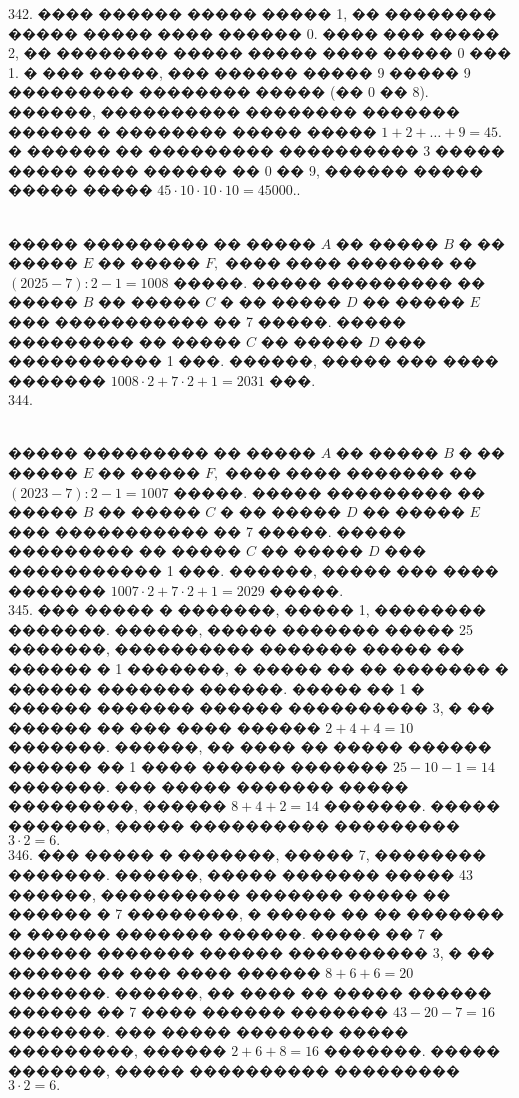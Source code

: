 \documentclass[12pt]{article}
\begin{document}
342. ���� ������ ����� ����� 1, �� �������� ����� ����� ���� ������ 0. ���� ��� ����� 2, �� �������� ����� ����� ���� ����� 0 ��� 1. � ��� �����, ��� ������ ����� 9 ����� 9 ��������� �������� ����� (�� 0 �� 8). ������, ���������� �������� ������� ������ � �������� ����� ����� $1+2+\ldots+9=45.$ � ������ �� ��������� ���������� 3 ����� ����� ���� ������ �� 0 �� 9, ������ ����� ����� ����� $45\cdot10\cdot10\cdot10=45000.$\newpage{}. \begin{figure}[ht!]
\end{figure}\\
����� ��������� �� ����� $A$ �� ����� $B$ � �� ����� $E$ �� ����� $F,$ ���� ���� ������� �� $(2025-7):2-1=1008$ �����. ����� ��������� �� ����� $B$ �� ����� $C$ � �� ����� $D$ �� ����� $E$ ��� ����������� �� 7 �����. ����� ��������� �� ����� $C$ �� ����� $D$ ��� ����������� 1 ���. ������, ����� ��� ���� ������� $1008\cdot2+7\cdot2+1=2031$ ���.\\
344. \begin{figure}[ht!]
\end{figure}\\
����� ��������� �� ����� $A$ �� ����� $B$ � �� ����� $E$ �� ����� $F,$ ���� ���� ������� �� $(2023-7):2-1=1007$ �����. ����� ��������� �� ����� $B$ �� ����� $C$ � �� ����� $D$ �� ����� $E$ ��� ����������� �� 7 �����. ����� ��������� �� ����� $C$ �� ����� $D$ ��� ����������� 1 ���. ������, ����� ��� ���� ������� $1007\cdot2+7\cdot2+1=2029$ �����.\\
345. ��� ����� � �������, ����� 1, �������� �������. ������, ����� ������� ����� 25 �������, ���������� ������� ����� �� ������ � 1 �������, � ����� �� �� ������� � ������ ������� ������. ����� �� 1 � ������ ������� ������ ���������� 3, � �� ������ �� ��� ���� ������ $2+4+4=10$ �������. ������, �� ���� �� ����� ������ ������ �� 1 ���� ������ ������� $25-10-1=14$ �������. ��� ����� ������� ����� ���������, ������ $8+4+2=14$ �������. ����� �������, ����� ���������� ��������� $3\cdot2=6.$\\
346. ��� ����� � �������, ����� 7, �������� �������. ������, ����� ������� ����� 43 ������, ���������� ������� ����� �� ������ � 7 ��������, � ����� �� �� ������� � ������ ������� ������. ����� �� 7 � ������ ������� ������ ���������� 3, � �� ������ �� ��� ���� ������ $8+6+6=20$ �������. ������, �� ���� �� ����� ������ ������ �� 7 ���� ������ ������� $43-20-7=16$ �������. ��� ����� ������� ����� ���������, ������ $2+6+8=16$ �������. ����� �������, ����� ���������� ��������� $3\cdot2=6.$\\
\end{document}
